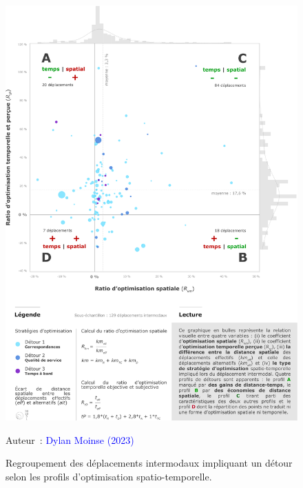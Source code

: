 \begin{refsegment}
    \begin{figure}[h!]\vspace*{4pt}
        \caption{Regroupement des déplacements intermodaux impliquant un détour selon les profils d'optimisation spatio-temporelle.}
        \label{fig-chap5:profils-strategies-optimisation-detours}
        \centerline{\includegraphics[width=1\columnwidth]{src/Figures/Chap-5/FR_Detours_Cluster_optimisation_detours.pdf}}
        \vspace{5pt}
        \begin{flushright}\scriptsize{
        Auteur~: \textcolor{blue}{Dylan Moinse (2023)}
        }\end{flushright}
    \end{figure}
    

\end{refsegment}
